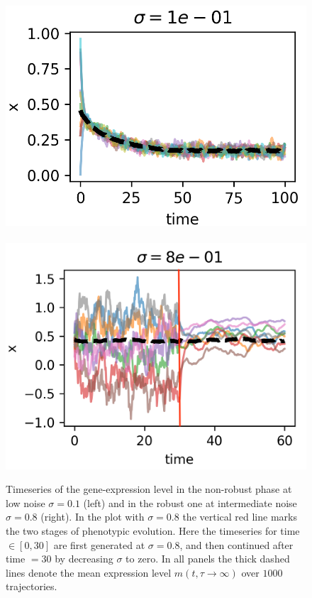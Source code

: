 \documentclass[%
 reprint,
superscriptaddress,
 amsmath,amssymb,
 prl,
]{revtex4-2}
\begin{document}
\begin{figure}
\includegraphics[scale=0.59]{Figure_2a.png}\,\,
\includegraphics[scale=0.505]{Figure_2b}
\caption{Timeseries of the gene-expression level in the non-robust phase at low noise $\sigma = 0.1$ (left) and in the robust one at intermediate noise $\sigma = 0.8$ (right). In the plot with $\sigma = 0.8$   the vertical red line  marks the two stages of phenotypic evolution.  Here the timeseries for time $\in [0,30]$ are first generated at $\sigma = 0.8$, and then   continued after time $= 30$ by decreasing $\sigma$ to zero.  In all panels the thick dashed lines denote the mean expression level $m(t, \tau \rightarrow \infty)$ over $1000$ trajectories.} 
\label{fig:fig2}
\end{figure}
\end{document}
